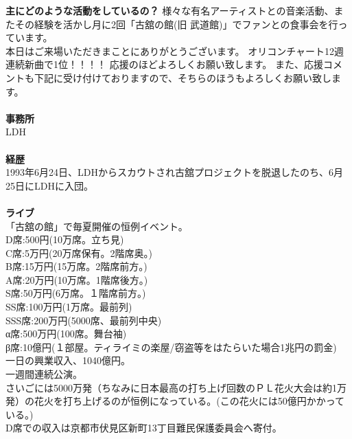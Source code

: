 {\bf 主にどのような活動をしているの？}
様々な有名アーティストとの音楽活動、またその経験を活かし月に2回「古舘の館(旧 武道館)」でファンとの食事会を行っています。\\
本日はご来場いただきまことにありがとうございます。 オリコンチャート12週連続新曲で1位！！！！ 応援のほどよろしくお願い致します。 また、応援コメントも下記に受け付けておりますので、そちらのほうもよろしくお願い致します。\\
 \\
{\bf 事務所}\\
LDH\\
 \\
{\bf 経歴}\\
1993年6月24日、LDHからスカウトされ古舘プロジェクトを脱退したのち、6月25日にLDHに入団。\\
 \\
{\bf ライブ}\\
「古舘の館」で毎夏開催の恒例イベント。\\
D席:500円(10万席。立ち見)\\
C席:5万円(20万席保有。2階席奥。)\\
B席:15万円(15万席。2階席前方。)\\
A席:20万円(10万席。1階席後方。)\\
S席:50万円(6万席。１階席前方。)\\
SS席:100万円(1万席。最前列)\\
SSS席:200万円(5000席、最前列中央)\\
α席:500万円(100席。舞台袖)\\
β席:10億円(１部屋。ティライミの楽屋/窃盗等をはたらいた場合1兆円の罰金)\\
一日の興業収入、1040億円。\\
一週間連続公演。\\
さいごには5000万発（ちなみに日本最高の打ち上げ回数のＰＬ花火大会は約1万発）の花火を打ち上げるのが恒例になっている。(この花火には50億円かかっている。)\\
D席での収入は京都市伏見区新町13丁目難民保護委員会へ寄付。\\

